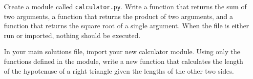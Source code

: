 \begin{problem} %
Create a module called \texttt{calculator.py}.
Write a function that returns the sum of two arguments, a function that returns the product of two arguments, and a function that returns the square root of a single argument.
When the file is either run or imported, nothing should be executed.

In your main solutions file, import your new calculator module.
Using only the functions defined in the module, write a new function that calculates the length of the hypotenuse of a right triangle given the lengths of the other two sides.
\end{problem}


